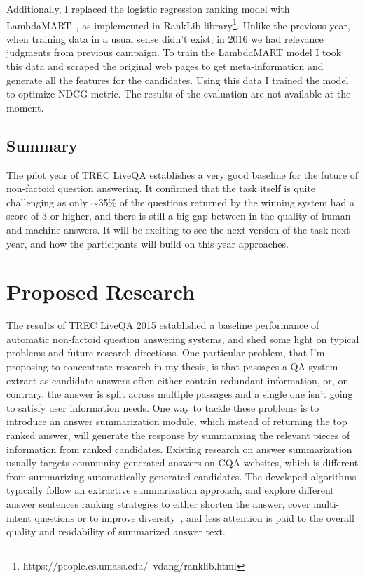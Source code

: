 Additionally, I replaced the logistic regression ranking model with LambdaMART~\cite{burges2010ranknet}, as implemented in RankLib library\footnote{https://people.cs.umass.edu/~vdang/ranklib.html}.
Unlike the previous year, when training data in a usual sense didn't exist, in 2016 we had relevance judgments from previous campaign.
To train the LambdaMART model I took this data and scraped the original web pages to get meta-information and generate all the features for the candidates.
Using this data I trained the model to optimize NDCG metric.
The results of the evaluation are not available at the moment.

\subsection{Summary}
\label{section:non-factoid:liveqa:summary}

The pilot year of TREC LiveQA establishes a very good baseline for the future of non-factoid question answering.
It confirmed that the task itself is quite challenging as only $\sim$35\% of the questions returned by the winning system had a score of 3 or higher, and there is still a big gap between in the quality of human and machine answers.
It will be exciting to see the next version of the task next year, and how the participants will build on this year approaches.



\section{Proposed Research}
\label{section:non-factoid:proposal}

The results of TREC LiveQA 2015 established a baseline performance of automatic non-factoid question answering systems, and shed some light on typical problems and future research directions.
One particular problem, that I'm proposing to concentrate research in my thesis, is that passages a QA system extract as candidate answers often either contain redundant information, or, on contrary, the answer is split across multiple passages and a single one isn't going to satisfy user information needs.
One way to tackle these problems is to introduce an answer summarization module, which instead of returning the top ranked answer, will generate the response by summarizing the relevant pieces of information from ranked candidates.
Existing research on answer summarization usually targets community generated answers on CQA websites, which is different from summarizing automatically generated candidates.
The developed algorithms typically follow an extractive summarization approach, and explore different answer sentences ranking strategies to either shorten the answer, cover multi-intent questions or to improve diversity~\cite{chan2012community,zhaochun_sparsecoding_2016}, and less attention is paid to the overall quality and readability of summarized answer text.

